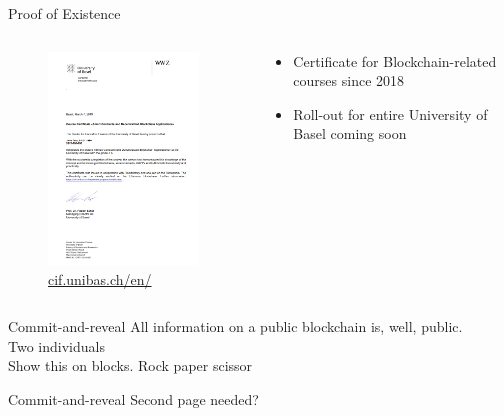 \documentclass[handout]{beamer}
\begin{document}

\begin{frame}{Proof of Existence}
	\begin{columns}
		\begin{column}{0.4\textwidth}
			\begin{figure}
				\centering
				\includegraphics[width=4cm, frame]{../assets/images/Diploma_unibas.PNG}
				\scriptsize{\href{https://cif.unibas.ch/en/events-projects/certificates/}{cif.unibas.ch/en/}}
			\end{figure}
		\end{column}
		\begin{column}{0.6\textwidth}
			\begin{itemize}
				\item<2 -> Certificate for Blockchain-related courses since 2018 
				\item<3 -> Roll-out for entire University of Basel coming soon
			\end{itemize}
		\end{column}
	\end{columns}
\end{frame}


\begin{frame}{Commit-and-reveal}
	All information on a public blockchain is, well, public.\\
	Two individuals\\
	Show this on blocks. Rock paper scissor
\end{frame}


\begin{frame}{Commit-and-reveal}
 Second page needed?
\end{frame}

\end{document}
